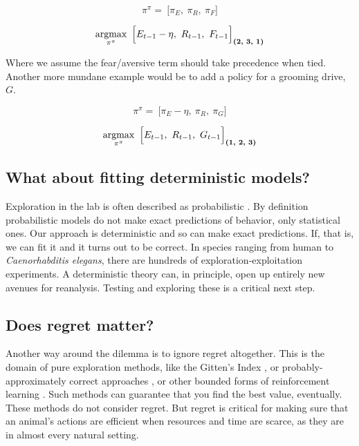 \begin{equation}
\label{eq:pipi_f} 
\pi^{\pi} = \ \Big [ \pi_E,\ \pi_R,\ \pi_F \Big ]
\end{equation}

\begin{equation}
\label{eq:meta_greedy_f} 
	\operatorname*{argmax}_{\pi^{\pi}} \ \Big [ E_{t-1} - \eta,\ R_{t-1},\ F_{t-1} \Big ]_{\textbf{(2, 3, 1)}}
\end{equation}

Where we assume the fear/aversive term should take precedence when tied. Another more mundane example would be to add a policy for a grooming drive, $G$. 

\begin{equation}
\label{eq:pipi_g} 
\pi^{\pi} = \ \Big [ \pi_E - \eta,\ \pi_R,\ \pi_G \Big ]
\end{equation}

\begin{equation}
\label{eq:meta_greedy_g} 
	\operatorname*{argmax}_{\pi^{\pi}} \ \Big [ E_{t-1},\ R_{t-1},\ G_{t-1} \Big ]_{\textbf{(1, 2, 3)}}
\end{equation}

\subsection*{What about fitting deterministic models?}
Exploration in the lab is often described as probabilistic \citep{Calhoun2014,Song2019a,Gershman2018b,Schulz2018a}. By definition probabilistic models do not make exact predictions of behavior, only statistical ones. Our approach is deterministic and so can make exact predictions. If, that is, we can fit it and it turns out to be correct. In species ranging from human to \textit{Caenorhabditis elegans}, there are hundreds of exploration-exploitation experiments. A deterministic theory can, in principle, open up entirely new avenues for reanalysis. Testing and exploring these is a critical next step.


\subsection*{Does regret matter?}
Another way around the dilemma is to ignore regret altogether. This is the domain of pure exploration methods, like the Gitten’s Index \citep{Gittins1979}, or probably-approximately correct approaches \citep{Valiant1984}, or other bounded forms of reinforcement learning \citep{Brafman2002}. Such methods can guarantee that you find the best value, eventually. These methods do not consider regret. But regret is critical for making sure that an animal's actions are efficient when resources and time are scarce, as they are in almost every natural setting. 


